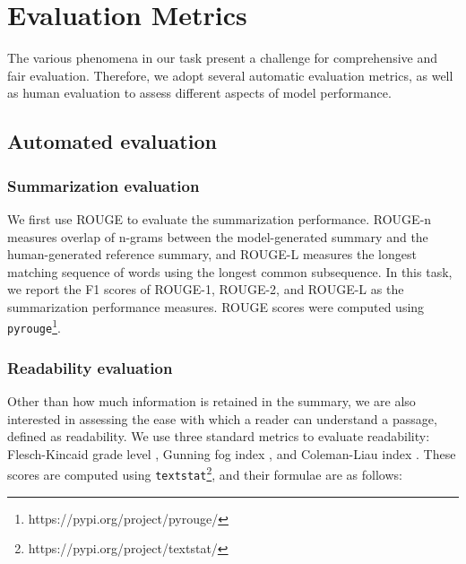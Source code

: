 \documentclass[letterpaper, table]{article} %
\begin{document}
\section{Evaluation Metrics}
\label{evaluation_metrics}

The various phenomena in our task present a challenge for comprehensive and fair evaluation. Therefore, we adopt several automatic evaluation metrics, as well as human evaluation to assess different aspects of model performance. %
\subsection{Automated evaluation}
\subsubsection{Summarization evaluation}
We first use ROUGE \cite{lin2004rouge} to evaluate the summarization performance.
ROUGE-n measures overlap of n-grams between the model-generated summary and the human-generated reference summary, and ROUGE-L measures the longest matching sequence of words using the longest common subsequence.
In this task, we report the F1 scores of ROUGE-1, ROUGE-2, and ROUGE-L as the summarization performance measures. ROUGE scores were computed using \texttt{pyrouge}\footnote{https://pypi.org/project/pyrouge/}.
\subsubsection{Readability evaluation} Other than how much information is retained in the summary, we are also interested in assessing the ease with which a reader can understand a passage, defined as readability. We use three standard metrics to evaluate readability: Flesch-Kincaid grade level \cite{kincaid1975derivation}, Gunning fog index \cite{gunning1952technique}, and Coleman-Liau index \cite{coleman1975computer}.
These scores are computed using \texttt{textstat}\footnote{https://pypi.org/project/textstat/}, and their formulae are as follows:
\end{document}
